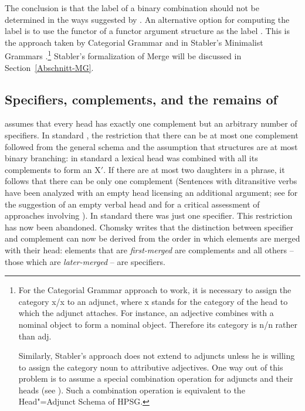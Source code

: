 The conclusion is that the label of a binary combination should not be determined in the ways
suggested by \citet{Chomsky2008a,Chomsky2013a}. An alternative option for computing the label is to use
the functor of a functor argument structure as the label \citep[]{BE95a}. This is the approach taken by Categorial
Grammar \citep{Ajdukiewicz35a-u,Steedman2000a-u} and in Stabler's Minimalist
Grammars \citeyearpar{Stabler2010b}.\footnote{%
For the Categorial Grammar approach to work, it is necessary to assign the
category x/x to an adjunct, where x stands for the category of the head to which the adjunct
attaches. For instance, an adjective combines with a nominal object to form a nominal
object. Therefore its category is n/n rather than adj. 

Similarly, Stabler's approach does not extend to adjuncts unless he is
willing to assign the category noun to attributive adjectives. One way out of this problem is to
assume a special combination operation for adjuncts and their heads (see
\citealp[Section~3.2]{FG2002a}). Such a combination operation is equivalent to the Head"=Adjunct
Schema of HPSG.
} Stabler's formalization of Merge will be discussed in Section~\ref{Abschnitt-MG}.



\subsection{Specifiers, complements, and the remains of \xbart}
\label{Abschnitt-Spezfikatoren-MP}

\mbox{}\citet[]{Chomsky2008a} assumes that every head has exactly one complement but an
arbitrary number of specifiers. In standard \xbart, the restriction that there can be at most one complement
followed from the general \xbar schema and the assumption that structures are at most binary
branching: in standard \xbart a lexical head was combined with all its complements
to form an X$'$. If there are at most two daughters in a phrase, it follows that there can be
only one complement (Sentences with ditransitive verbs have been analyzed with an empty head
licensing an additional argument; see  for the suggestion of an empty verbal head and  for a critical assessment of approaches involving \littlev). In standard \xbart
there was just one  specifier. This restriction has now been abandoned. Chomsky writes that the distinction between specifier
and complement can now be derived from the order in which elements are merged with their head: elements
that are \emph{first-merged} are complements and all others -- those which are \emph{later-merged} --
are specifiers.


